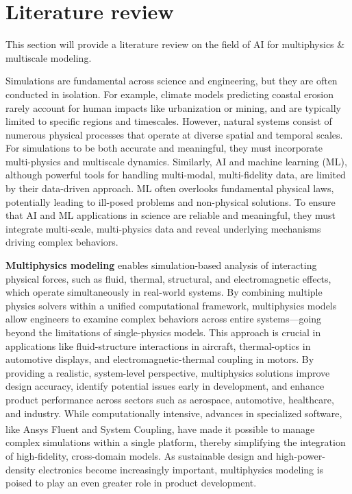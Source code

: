 \chapter{Literature review}

This section will provide a literature review on the field of AI for multiphysics \& multiscale modeling.

Simulations are fundamental across science and engineering, but they are often conducted in isolation. For example, climate models predicting coastal erosion rarely account for human impacts like urbanization or mining, and are typically limited to specific regions and timescales. However, natural systems consist of numerous physical processes that operate at diverse spatial and temporal scales. For simulations to be both accurate and meaningful, they must incorporate multi-physics and multiscale dynamics. Similarly, AI and machine learning (ML), although powerful tools for handling multi-modal, multi-fidelity data, are limited by their data-driven approach. ML often overlooks fundamental physical laws, potentially leading to ill-posed problems and non-physical solutions. To ensure that AI and ML applications in science are reliable and meaningful, they must integrate multi-scale, multi-physics data and reveal underlying mechanisms driving complex behaviors.

\textbf{Multiphysics modeling} enables simulation-based analysis of interacting physical forces, such as fluid, thermal, structural, and electromagnetic effects, which operate simultaneously in real-world systems. By combining multiple physics solvers within a unified computational framework, multiphysics models allow engineers to examine complex behaviors across entire systems—going beyond the limitations of single-physics models. This approach is crucial in applications like fluid-structure interactions in aircraft, thermal-optics in automotive displays, and electromagnetic-thermal coupling in motors. By providing a realistic, system-level perspective, multiphysics solutions improve design accuracy, identify potential issues early in development, and enhance product performance across sectors such as aerospace, automotive, healthcare, and industry. While computationally intensive, advances in specialized software, like Ansys Fluent\textsuperscript{\textregistered} and System Coupling\texttrademark, have made it possible to manage complex simulations within a single platform, thereby simplifying the integration of high-fidelity, cross-domain models. As sustainable design and high-power-density electronics become increasingly important, multiphysics modeling is poised to play an even greater role in product development.


